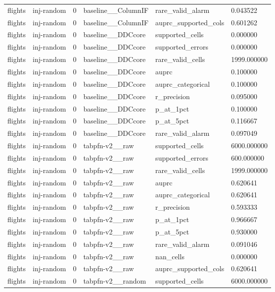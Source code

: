 \begin{tabular}{llllll}
flights & inj-random & 0 & baseline\_\_ColumnIF & rare\_valid\_alarm & 0.043522 \\
flights & inj-random & 0 & baseline\_\_ColumnIF & auprc\_supported\_cols & 0.601262 \\
flights & inj-random & 0 & baseline\_\_DDCcore & supported\_cells & 0.000000 \\
flights & inj-random & 0 & baseline\_\_DDCcore & supported\_errors & 0.000000 \\
flights & inj-random & 0 & baseline\_\_DDCcore & rare\_valid\_cells & 1999.000000 \\
flights & inj-random & 0 & baseline\_\_DDCcore & auprc & 0.100000 \\
flights & inj-random & 0 & baseline\_\_DDCcore & auprc\_categorical & 0.100000 \\
flights & inj-random & 0 & baseline\_\_DDCcore & r\_precision & 0.095000 \\
flights & inj-random & 0 & baseline\_\_DDCcore & p\_at\_1pct & 0.100000 \\
flights & inj-random & 0 & baseline\_\_DDCcore & p\_at\_5pct & 0.116667 \\
flights & inj-random & 0 & baseline\_\_DDCcore & rare\_valid\_alarm & 0.097049 \\
flights & inj-random & 0 & tabpfn-v2\_\_raw & supported\_cells & 6000.000000 \\
flights & inj-random & 0 & tabpfn-v2\_\_raw & supported\_errors & 600.000000 \\
flights & inj-random & 0 & tabpfn-v2\_\_raw & rare\_valid\_cells & 1999.000000 \\
flights & inj-random & 0 & tabpfn-v2\_\_raw & auprc & 0.620641 \\
flights & inj-random & 0 & tabpfn-v2\_\_raw & auprc\_categorical & 0.620641 \\
flights & inj-random & 0 & tabpfn-v2\_\_raw & r\_precision & 0.593333 \\
flights & inj-random & 0 & tabpfn-v2\_\_raw & p\_at\_1pct & 0.966667 \\
flights & inj-random & 0 & tabpfn-v2\_\_raw & p\_at\_5pct & 0.930000 \\
flights & inj-random & 0 & tabpfn-v2\_\_raw & rare\_valid\_alarm & 0.091046 \\
flights & inj-random & 0 & tabpfn-v2\_\_raw & nan\_cells & 0.000000 \\
flights & inj-random & 0 & tabpfn-v2\_\_raw & auprc\_supported\_cols & 0.620641 \\
flights & inj-random & 0 & tabpfn-v2\_\_random & supported\_cells & 6000.000000 \\

\end{tabular}
